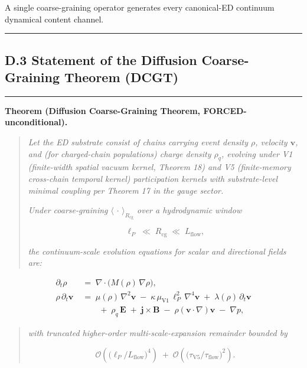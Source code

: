 \documentclass[
  11pt,a4paper]{article}
\begin{document}
A single coarse-graining operator generates every canonical-ED continuum
dynamical content channel.

\begin{center}\rule{0.5\linewidth}{0.5pt}\end{center}

\subsection{D.3 Statement of the Diffusion Coarse-Graining Theorem
(DCGT)}\label{d.3-statement-of-the-diffusion-coarse-graining-theorem-dcgt}

\begin{center}\rule{0.5\linewidth}{0.5pt}\end{center}

\textbf{Theorem (Diffusion Coarse-Graining Theorem,
FORCED-unconditional).}

\begin{quote}
\emph{Let the ED substrate consist of chains carrying event density
\(\rho\), velocity \(\mathbf{v}\), and (for charged-chain populations)
charge density \(\rho_q\), evolving under V1 (finite-width spatial
vacuum kernel, Theorem 18) and V5 (finite-memory cross-chain temporal
kernel) participation kernels with substrate-level minimal coupling per
Theorem 17 in the gauge sector.}

\emph{Under coarse-graining \(\langle\,\cdot\,\rangle_{R_\mathrm{cg}}\)
over a hydrodynamic window}

\[\ell_P \;\ll\; R_\mathrm{cg} \;\ll\; L_\mathrm{flow},\]

\emph{the continuum-scale evolution equations for scalar and directional
fields are:}
\end{quote}

\[\boxed{\;\begin{aligned}
\partial_t\rho \;&=\; \nabla\cdot\bigl(M(\rho)\,\nabla\rho\bigr), \\[4pt]
\rho\,\partial_t\mathbf{v} \;&=\; \mu(\rho)\,\nabla^2\mathbf{v} \;-\; \kappa\,\mu_\mathrm{V1}\,\ell_P^2\,\nabla^4\mathbf{v} \;+\; \lambda(\rho)\,\partial_t\mathbf{v} \\[2pt]
&\qquad +\; \rho_q\,\mathbf{E} \;+\; \mathbf{j}\times\mathbf{B} \;-\; \rho(\mathbf{v}\cdot\nabla)\mathbf{v} \;-\; \nabla p,
\end{aligned}\;}\]

\begin{quote}
\emph{with truncated higher-order multi-scale-expansion remainder
bounded by}

\[\mathcal{O}\!\left(\bigl(\ell_P/L_\mathrm{flow}\bigr)^4\right) \;+\; \mathcal{O}\!\left(\bigl(\tau_\mathrm{V5}/\tau_\mathrm{flow}\bigr)^2\right).\]
\end{quote}
\end{document}
